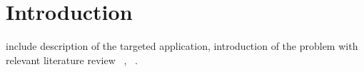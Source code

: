 \section{Introduction}
include description of the targeted application, introduction of the problem with relevant literature review ~\cite{cha1}, ~\cite{cha2}.
